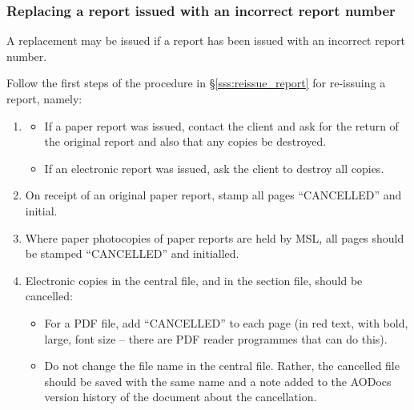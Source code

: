 \subsubsection{Replacing a report issued with an incorrect report number}

A replacement may be issued if a report has been issued with an incorrect report number. 

Follow the first steps of the procedure in \S\ref{sss:reissue_report} for re-issuing a report, namely:

\begin{enumerate}
\item 
\begin{itemize} 
\item If a paper report was issued, contact the client and ask for the return of the original report and also that any copies be destroyed. 

\item If an electronic report was issued, ask the client to destroy all copies.
\end{itemize}

\item On receipt of an original paper report, stamp all pages ``{\color{red}CANCELLED}” and initial.

\item Where paper photocopies of paper reports are held by MSL, all pages should be stamped ``{\color{red}CANCELLED}” and initialled.

\item Electronic copies in the central file, and in the section file, should be cancelled:
\begin{itemize}
\item For a PDF file, add “{\color{red}CANCELLED}” to each page (in red text, with bold, large, font size – there are PDF reader programmes that can do this). 
\item Do not change the file name in the central file. Rather, the cancelled file should be saved with the same name and a note added to the AODocs version history of the document about the cancellation. 
\end{itemize}
\end{enumerate}

